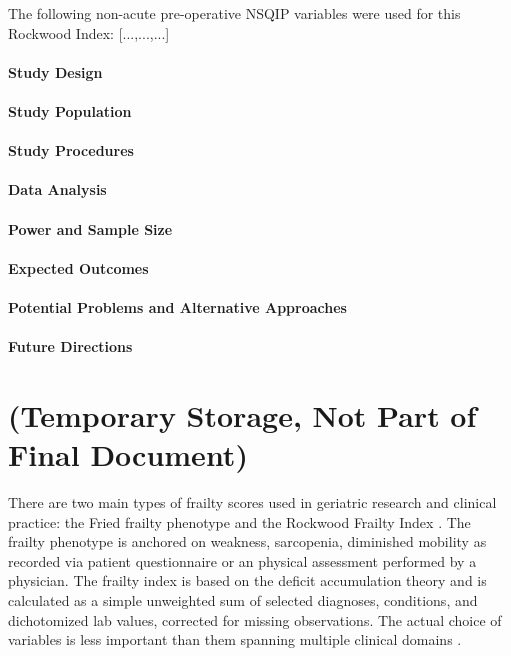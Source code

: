The following non-acute pre-operative NSQIP variables were used for this Rockwood Index: [...,...,...]

\paragraph{Study Design}\label{study-design}


\paragraph{Study Population}\label{study-population}


\paragraph{Study Procedures}\label{study-procedures}


\paragraph{Data Analysis}\label{data-analysis}

\paragraph{Power and Sample Size}\label{power-and-sample-size}

\paragraph{Expected Outcomes}\label{expected-outcomes}

\paragraph{Potential Problems and Alternative
      Approaches}\label{potential-problems-and-alternative-approaches}

\paragraph{Future Directions}\label{future-directions} 
    
\section{(Temporary Storage, Not Part of Final Document)}\label{ammo}
There are two main types of frailty scores used in geriatric research and clinical practice: the Fried frailty phenotype \cite{Fried_2001} and the Rockwood Frailty Index \cite{Mitnitski_2001}. The frailty phenotype is anchored on weakness, sarcopenia, diminished mobility as recorded via patient questionnaire or an physical assessment performed by a physician. The frailty index is based on the deficit accumulation theory and is calculated as a simple unweighted sum of selected diagnoses, conditions, and dichotomized lab values, corrected for missing observations. The actual choice of variables is less important than them spanning multiple clinical domains \cite{Searle_2008}. 

